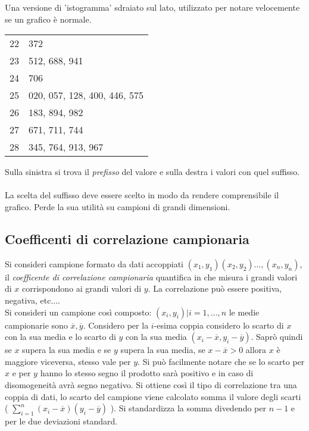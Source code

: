 \documentclass{article}
\begin{document}
Una versione di 'istogramma' sdraiato sul lato, utilizzato per notare velocemente se un grafico è normale.


\hfill

\begin{minipage}[c]{0.35\textwidth}
    \centering
    \begin{tabular}{r|l}
        22 & 372 \\
        23 & 512, 688, 941 \\
        24 & 706 \\
        25 & 020, 057, 128, 400, 446, 575 \\
        26 & 183, 894, 982 \\
        27 & 671, 711, 744 \\
        28 & 345, 764, 913, 967 \\
    \end{tabular}
\end{minipage}
\hspace{2mm}
\begin{minipage}[c]{0.6\textwidth}
    \vspace{-2mm}
    Sulla sinistra si trova il \textit{prefisso} del valore e sulla destra i valori con quel suffisso. \\ \\
    La scelta del suffisso deve essere scelto in modo da rendere comprensibile il grafico. Perde la sua utilità su campioni di grandi dimensioni.
\end{minipage}

\hfill

\subsection*{Coefficenti di correlazione campionaria}

Si consideri campione formato da dati accoppiati $(x_1,y_1)(x_2,y_2)\dots,(x_n,y_n)$, il \textit{coefficente di correlazione campionaria} quantifica in che misura i grandi valori di $x$ corrispondono ai grandi valori di $y$.  La correlazione può essere positiva, negativa, etc$\dots$. \\
Si consideri un campione così composto: $(x_i,y_i)| i=1,\dots,n$ le medie campionarie sono $\overline{x}, \overline{y}$. Considero per la $i$-esima coppia considero lo scarto di $x$ con la sua media e lo scarto di $y$ con la sua media $(x_i-\overline{x}, y_i-\overline{y})$. Saprò quindi se $x$ supera la sua media e se $y$ supera la sua media, se $x - \overline{x} > 0$ allora $x$ è maggiore viceversa, stesso vale per $y$. Si può facilmente notare che se lo scarto per $x$ e per $y$ hanno lo stesso segno il prodotto sarà positivo e in caso di disomogeneità avrà segno negativo. Si ottiene così il tipo di correlazione tra una coppia di dati, lo scarto del campione viene calcolato somma il valore degli scarti ( $\sum_{i=1}^n(x_i-\overline{x})(y_i-\overline{y})$ ). Si standardizza la somma divedendo per $n-1$ e per le due deviazioni standard. 
\end{document}
